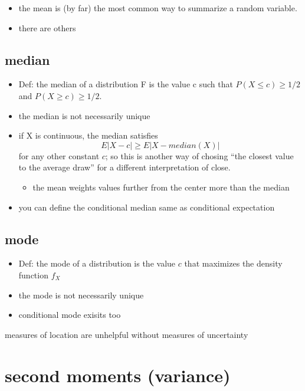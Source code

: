 \begin{itemize}
\item the mean is (by far) the most common way to summarize a random variable.
\item there are others
\end{itemize}

\subsection{median}

\begin{itemize}
\item Def: the median of a distribution F is the value c such that $P(X
       \leq c) \geq 1/2$ and $P(X \geq c) \geq 1/2$.
\item the median is not necessarily unique
\item if X is continuous, the median satisfies 
       \[ E | X - c | \geq E | X - median(X) | \]
       for any other constant $c$; so this is another way of chosing
       ``the closest value to the average draw'' for a different
       interpretation of close.
\begin{itemize}
\item the mean weights values further from the center more than
         the median
\end{itemize}
\item you can define the conditional median same as conditional expectation
\end{itemize}

\subsection{mode}

\begin{itemize}
\item Def: the mode of a distribution is the value $c$ that maximizes
       the density function $f_X$
\item the mode is not necessarily unique
\item conditional mode exisits too
\end{itemize}
     measures of location are unhelpful without measures of uncertainty

\section{second moments (variance)}

